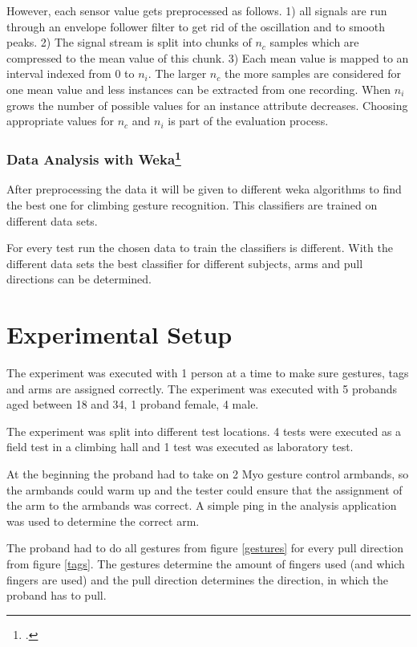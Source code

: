 \documentclass[journal]{IEEEtran}
\begin{document}
However, each sensor value gets preprocessed as follows. 1) all signals are run through an envelope follower filter to get rid of the oscillation and to smooth peaks. 2) The signal stream is split into chunks of $n_c$ samples which are compressed to the mean value of this chunk. 3) Each mean value is mapped to an interval indexed from $0$ to $n_i$. The larger $n_c$ the more samples are considered for one mean value and less instances can be extracted from one recording. When $n_i$ grows the number of possible values for an instance attribute decreases. Choosing appropriate values for $n_c$ and $n_i$ is part of the evaluation process.

\subsubsection{Data Analysis with Weka\footcite{weka}}
After preprocessing the data it will be given to different weka algorithms to find the best one for climbing gesture recognition. This classifiers are trained on different data sets. 

For every test run the chosen data to train the classifiers is different. With the different data sets the best classifier for different subjects, arms and pull directions can be determined.

\section{Experimental Setup}
The experiment was executed with 1 person at a time to make sure gestures, tags and arms are assigned correctly. The experiment was executed with 5 probands aged between 18 and 34, 1 proband female, 4 male.

The experiment was split into different test locations. 4 tests were executed as a field test in a climbing hall and 1 test was executed as laboratory test.

At the beginning the proband had to take on 2 Myo gesture control armbands, so the armbands could warm up and the tester could ensure that the assignment of the arm to the armbands was correct. A simple ping in the analysis application was used to determine the correct arm.

The proband had to do all gestures from figure \ref{gestures} for every pull direction from figure \ref{tags}. The gestures determine the amount of fingers used (and which fingers are used) and the pull direction determines the direction, in which the proband has to pull.
\end{document}
